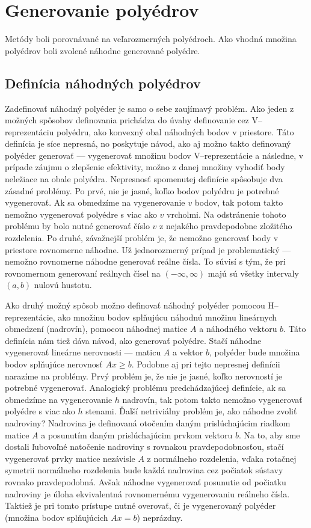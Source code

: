 \section{Generovanie polyédrov}
Metódy boli porovnávané na veľarozmerných polyédroch. 
Ako vhodná množina polyédrov boli zvolené náhodne generované polyédre.

\subsection{Definícia náhodných polyédrov}
Zadefinovať náhodný polyéder je samo o sebe zaujímavý problém. Ako jeden z možných spôsobov definovania prichádza do úvahy definovanie cez V--reprezentáciu polyédru, ako konvexný obal náhodných bodov v priestore. Táto definícia je síce nepresná, no poskytuje návod, ako aj možno takto definovaný polyéder generovať --- vygenerovať množinu bodov V--reprezentácie a následne, v prípade záujmu o zlepšenie efektivity, možno z danej množiny vyhodiť body neležiace na obale polyédra. Nepresnosť spomenutej definície spôsobuje dva zásadné problémy.
Po prvé, nie je jasné, koľko bodov polyédru je potrebné vygenerovať. Ak sa obmedzíme na vygenerovanie $v$ bodov, tak potom takto nemožno vygenerovať polyédre s viac ako $v$ vrcholmi. Na odstránenie tohoto problému by bolo nutné generovať číslo $v$ z nejakého pravdepodobne zložitého rozdelenia. 
Po druhé, závažnejší problém je, že nemožno generovať body v priestore rovnomerne náhodne. Už jednorozmerný prípad je problematický --- nemožno rovnomerne náhodne generovať reálne čísla. To súvisí s tým, že pri rovnomernom generovaní reálnych čísel na $(-\infty, \infty)$ majú sú všetky intervaly $(a,b)$ nulovú hustotu.

Ako druhý možný spôsob možno definovať náhodný polyéder pomocou H--reprezentácie, ako množinu bodov splňujúcu náhodnú množinu lineárnych obmedzení (nadrovín), pomocou náhodnej matice $A$ a náhodného vektoru $b$. Táto definícia nám tiež dáva návod, ako generovať polyédre. Stačí náhodne vygenerovať lineárne nerovnosti --- maticu $A$ a vektor $b$, polyéder bude množina bodov splňujúce nerovnosť $Ax\geq b$. Podobne aj pri tejto nepresnej definícii narazíme na problémy. Prvý problém je, že nie je jasné, koľko nerovností je potrebné vygenerovať. Analogický problému predchádzajúcej definície, ak sa obmedzíme na vygenerovanie $h$ nadrovín, tak potom takto nemožno vygenerovať polyédre s viac ako $h$ stenami.
Ďalší netriviálny problém je, ako náhodne zvoliť nadroviny? Nadrovina je definovaná otočením daným prislúchajúcim riadkom matice $A$ a posunutím daným prislúchajúcim prvkom vektoru $b$. Na to, aby sme dostali ľubovoľné natočenie nadroviny s rovnakou pravdepodobnosťou, stačí vygenerovať prvky matice nezávisle $A$ z normálneho rozdelenia, vďaka rotačnej symetrii normálneho rozdelenia bude každá nadrovina cez počiatok sústavy rovnako pravdepodobná. Avšak náhodne vygenerovať posunutie od počiatku nadroviny je úloha ekvivalentná rovnomernému vygenerovaniu reálneho čísla. Taktiež je pri tomto prístupe nutné overovať, či je vygenerovaný polyéder (množina bodov splňujúcich $Ax=b$) neprázdny.


